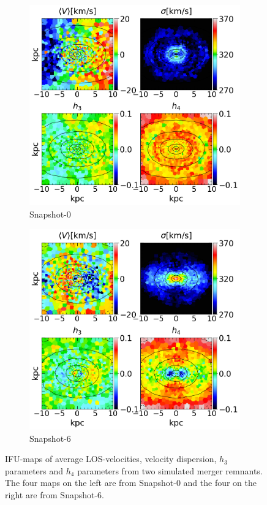 \documentclass[english, oneside]{HYgradu}
\begin{document}
\begin{figure}
	\centering
	\begin{subfigure}[b]{0.49\textwidth}
		\includegraphics[width=\textwidth]{BH_0.png}
		\caption{Snapshot-0}
	\end{subfigure}
	\begin{subfigure}[b]{0.49\textwidth}
		\includegraphics[width=\textwidth]{BH_6.png}
		\caption{Snapshot-6}
	\end{subfigure}
	\caption{IFU-maps of average LOS-velocities, velocity dispersion, $h_3$ parameters and $h_4$ parameters from two simulated merger remnants. The four maps on the left are from Snapshot-0 and the four on the right are from Snapshot-6.}
	\label{figure:snapshot_0_and_1_IFU}
\end{figure}
\end{document}
